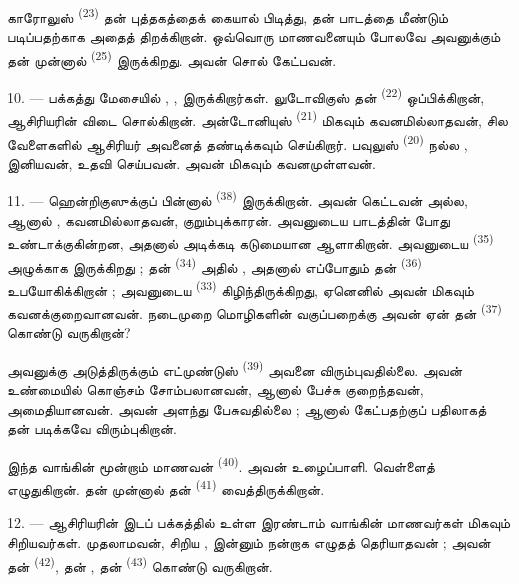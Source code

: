 காரோலுஸ் \textsuperscript{(23)} தன் புத்தகத்தைக் கையால் பிடித்து, தன் பாடத்தை
மீண்டும் படிப்பதற்காக அதைத் திறக்கிறான். ஒவ்வொரு மாணவனையும் போலவே அவனுக்கும்
தன் முன்னால்  \textsuperscript{(25)} இருக்கிறது. அவன் சொல்
கேட்பவன்.

10. --- பக்கத்து மேசையில் , ,
 இருக்கிறார்கள். லுடோவிகுஸ் தன் 
\textsuperscript{(22)} ஒப்பிக்கிறான், ஆசிரியரின் 
விடை சொல்கிறான். அன்டோனியுஸ் \textsuperscript{(21)} மிகவும் கவனமில்லாதவன்,
சில வேளைகளில் ஆசிரியர் அவனைத் தண்டிக்கவும் செய்கிறார். பவுலுஸ்
\textsuperscript{(20)} நல்ல , இனியவன், உதவி செய்பவன். அவன்
மிகவும் கவனமுள்ளவன்.

\VUsaut{4.2mm}
\VUsaut{3.2mm}

11. --- ஹென்றிகுஸுக்குப் பின்னால்  \textsuperscript{(38)}
இருக்கிறான். அவன் கெட்டவன் அல்ல, ஆனால் ,
கவனமில்லாதவன், குறும்புக்காரன். அவனுடைய 
 பாடத்தின் போது  உண்டாக்குகின்றன,
அதனால் அடிக்கடி கடுமையான  ஆளாகிறான். அவனுடைய
 \textsuperscript{(35)} அழுக்காக இருக்கிறது ; தன்
 \textsuperscript{(34)} அதில் ,
அதனால் எப்போதும் தன்  \textsuperscript{(36)} உபயோகிக்கிறான் ;
அவனுடைய  \textsuperscript{(33)} கிழிந்திருக்கிறது, ஏனெனில்
அவன் மிகவும் கவனக்குறைவானவன். நடைமுறை மொழிகளின் வகுப்பறைக்கு அவன் ஏன் தன்
 \textsuperscript{(37)} கொண்டு வருகிறான்?

அவனுக்கு அடுத்திருக்கும் எட்முண்டுஸ் \textsuperscript{(39)} அவனை
விரும்புவதில்லை. அவன் உண்மையில் கொஞ்சம் சோம்பலானவன், ஆனால் பேச்சு
குறைந்தவன், அமைதியானவன். அவன் அளந்து பேசுவதில்லை ; ஆனால் கேட்பதற்குப் பதிலாகத்
தன்   படிக்கவே
விரும்புகிறான்.

இந்த வாங்கின் மூன்றாம் மாணவன்  \textsuperscript{(40)}. அவன்
உழைப்பாளி. வெள்ளைத்  எழுதுகிறான். தன் முன்னால் தன்
 \textsuperscript{(41)} வைத்திருக்கிறான்.

12. --- ஆசிரியரின் இடப் பக்கத்தில் உள்ள இரண்டாம் வாங்கின் மாணவர்கள் மிகவும்
சிறியவர்கள். முதலாமவன், சிறிய , இன்னும் நன்றாக எழுதத்
தெரியாதவன் ; அவன் தன்  \textsuperscript{(42)}, தன்
, தன் 
\textsuperscript{(43)} கொண்டு வருகிறான்.


